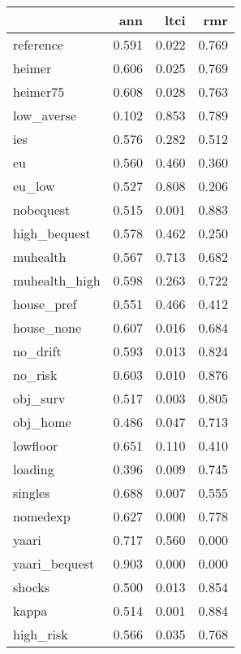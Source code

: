 \begin{tabular}{lrrr}
\toprule
{} &    ann &   ltci &    rmr \\
\midrule
reference     &  0.591 &  0.022 &  0.769 \\
heimer        &  0.606 &  0.025 &  0.769 \\
heimer75      &  0.608 &  0.028 &  0.763 \\
low\_averse    &  0.102 &  0.853 &  0.789 \\
ies           &  0.576 &  0.282 &  0.512 \\
eu            &  0.560 &  0.460 &  0.360 \\
eu\_low        &  0.527 &  0.808 &  0.206 \\
nobequest     &  0.515 &  0.001 &  0.883 \\
high\_bequest  &  0.578 &  0.462 &  0.250 \\
muhealth      &  0.567 &  0.713 &  0.682 \\
muhealth\_high &  0.598 &  0.263 &  0.722 \\
house\_pref    &  0.551 &  0.466 &  0.412 \\
house\_none    &  0.607 &  0.016 &  0.684 \\
no\_drift      &  0.593 &  0.013 &  0.824 \\
no\_risk       &  0.603 &  0.010 &  0.876 \\
obj\_surv      &  0.517 &  0.003 &  0.805 \\
obj\_home      &  0.486 &  0.047 &  0.713 \\
lowfloor      &  0.651 &  0.110 &  0.410 \\
loading       &  0.396 &  0.009 &  0.745 \\
singles       &  0.688 &  0.007 &  0.555 \\
nomedexp      &  0.627 &  0.000 &  0.778 \\
yaari         &  0.717 &  0.560 &  0.000 \\
yaari\_bequest &  0.903 &  0.000 &  0.000 \\
shocks        &  0.500 &  0.013 &  0.854 \\
kappa         &  0.514 &  0.001 &  0.884 \\
high\_risk     &  0.566 &  0.035 &  0.768 \\
\bottomrule
\end{tabular}
